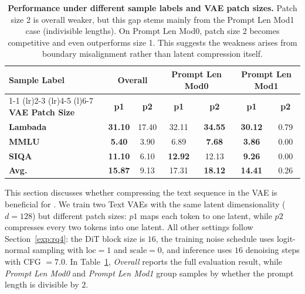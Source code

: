 \begin{table}[t]
    \centering
    \caption{\textbf{Performance under different sample labels and VAE patch sizes.} Patch size 2 is overall weaker, but this gap stems mainly from the Prompt Len Mod1 case (indivisible lengths). On Prompt Len Mod0, patch size 2 becomes competitive and even outperforms size 1. This suggests the weakness arises from boundary misalignment rather than latent compression itself.}
    \label{tab:sample_label_vae_patch}
    \small
    \setlength{\tabcolsep}{5pt}
    \renewcommand{\arraystretch}{1.10}
    \begin{tabular*}{\textwidth}{@{\extracolsep{\fill}}lcccccc}
        \toprule
        \textbf{Sample Label}
        & \multicolumn{2}{c}{\textbf{Overall}}
        & \multicolumn{2}{c}{\textbf{Prompt Len Mod0}}
        & \multicolumn{2}{c}{\textbf{Prompt Len Mod1}} \\
        \cmidrule(r){1-1} \cmidrule(lr){2-3} \cmidrule(lr){4-5} \cmidrule(l){6-7}
        \textbf{VAE Patch Size}
        & \textbf{p1} & \textbf{p2}
        & \textbf{p1} & \textbf{p2}
        & \textbf{p1} & \textbf{p2} \\
        \midrule
        \textbf{Lambada} & \textbf{31.10} & 17.40 & 32.11 & \textbf{34.55} & \textbf{30.12} & 0.79 \\
        \textbf{MMLU}    & \textbf{5.40}  & 3.90  & 6.89  & \textbf{7.68}  & \textbf{3.86}  & 0.00 \\
        \textbf{SIQA}    & \textbf{11.10} & 6.10  & \textbf{12.92} & 12.13 & \textbf{9.26} & 0.00 \\
        \midrule
        \textbf{Avg.}    & \textbf{15.87} & 9.13  & 17.31 & \textbf{18.12} & \textbf{14.41} & 0.26 \\
        \bottomrule
    \end{tabular*}
\end{table}

This section discusses whether compressing the text sequence in the VAE is beneficial for \method. We train two Text VAEs with the same latent dimensionality ($d=128$) but different patch sizes: $p1$ maps each token to one latent, while $p2$ compresses every two tokens into one latent. All other settings follow Section~\ref{exp:rq4}: the DiT block size is $16$, the training noise schedule uses logit-normal sampling with $\mathrm{loc}=1$ and $\mathrm{scale}=0$, and inference uses $16$ denoising steps with CFG $=7.0$. In Table~\ref{tab:sample_label_vae_patch}, \textit{Overall} reports the full evaluation result, while \textit{Prompt Len Mod0} and \textit{Prompt Len Mod1} group samples by whether the prompt length is divisible by $2$.

